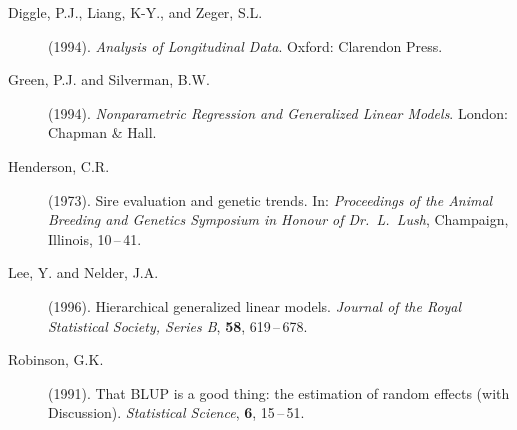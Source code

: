\documentclass[twoside]{report}
\begin{document}
\begin{description}
\item[Diggle, P.J., Liang, K-Y., and Zeger, S.L.] (1994).
     {\it Analysis of Longitudinal Data}.
     Oxford: Clarendon Press.
\item[Green, P.J. and Silverman, B.W.] (1994).
     {\it Nonparametric Regression and Generalized Linear Models}.
     London: Chapman \& Hall.
\item[Henderson, C.R.] (1973).
     Sire evaluation and genetic trends.
     In: {\it Proceedings of the Animal Breeding and Genetics Symposium in
     Honour of Dr.\ L.\ Lush}, Champaign, Illinois, 10\,--\,41.
\item[Lee, Y. and Nelder, J.A.] (1996).
     Hierarchical generalized linear models.
     {\it Journal of the Royal Statistical Society, Series B}, {\bf 58},
      619\,--\,678.
\item[Robinson, G.K.] (1991).
     That BLUP is a good thing: the estimation of random effects (with Discussion).
     {\it Statistical Science}, {\bf 6}, 15\,--\,51.
\end{description}
\end{document}
